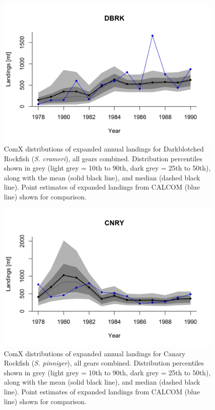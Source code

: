 \documentclass[12pt]{article}
\begin{document}
%
\clearpage
%

\begin{landscape}
\begin{figure}
\centering
\vspace{-2cm}
\includegraphics[width=1.3\textwidth]{./pictures/sp-yr/DBRK.png}
\caption{ComX distributions of expanded annual landings for Darkblotched Rockfish 
(\textit{S. crameri}), all gears combined. Distribution percentiles shown in grey 
(light grey = 10th to 90th, dark grey = 25th to 50th), along with the mean 
(solid black line), and median (dashed black line). Point estimates of 
expanded landings from CALCOM (blue line) shown for comparison.}
\label{Y7}
\end{figure}
\end{landscape}

%
\clearpage
%

\begin{landscape}
\begin{figure}
\centering
\vspace{-2cm}
\includegraphics[width=1.3\textwidth]{./pictures/sp-yr/CNRY.png}
\caption{ComX distributions of expanded annual landings for Canary Rockfish 
(\textit{S. pinniger}), all gears combined. Distribution percentiles shown in grey 
(light grey = 10th to 90th, dark grey = 25th to 50th), along with the mean 
(solid black line), and median (dashed black line). Point estimates of 
expanded landings from CALCOM (blue line) shown for comparison.}
\label{Y8}
\end{figure}
\end{landscape}
\end{document}
